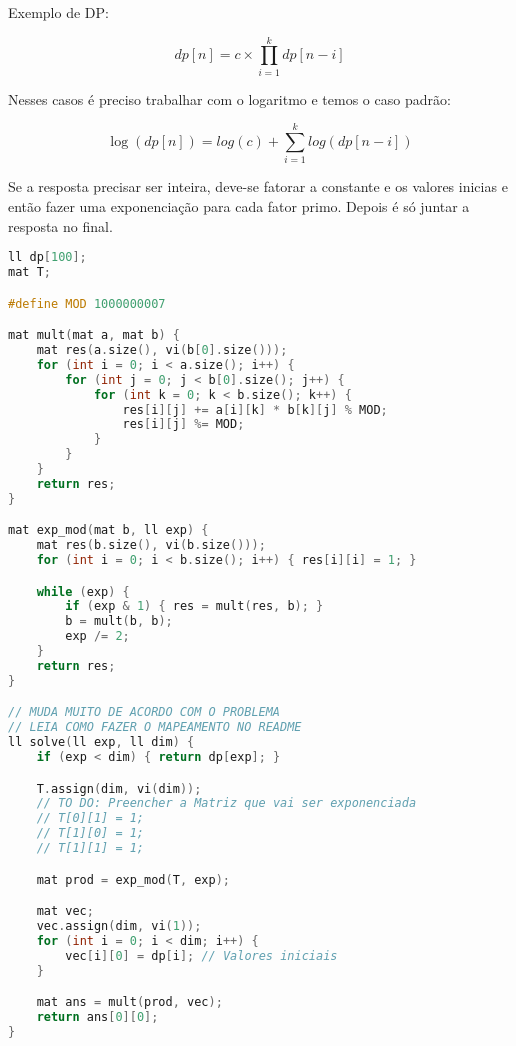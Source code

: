 \documentclass[11pt, a4paper, twoside]{book}
\begin{document}
\textbf{} 


Exemplo de DP:



$$ dp[n] =  c\times \prod_{i=1}^{k} dp[n-i] $$



Nesses casos é preciso trabalhar com o logaritmo e temos o caso padrão:





$$ \log(dp[n]) =  log(c) + \sum_{i=1}^{k} log(dp[n-i]) $$



Se a resposta precisar ser inteira, deve-se fatorar a constante e os valores inicias e então fazer uma exponenciação para cada fator primo. Depois é só juntar a resposta no final.


\hfill

\begin{lstlisting}[language=C++]
ll dp[100];
mat T;

#define MOD 1000000007

mat mult(mat a, mat b) {
    mat res(a.size(), vi(b[0].size()));
    for (int i = 0; i < a.size(); i++) {
        for (int j = 0; j < b[0].size(); j++) {
            for (int k = 0; k < b.size(); k++) {
                res[i][j] += a[i][k] * b[k][j] % MOD;
                res[i][j] %= MOD;
            }
        }
    }
    return res;
}

mat exp_mod(mat b, ll exp) {
    mat res(b.size(), vi(b.size()));
    for (int i = 0; i < b.size(); i++) { res[i][i] = 1; }

    while (exp) {
        if (exp & 1) { res = mult(res, b); }
        b = mult(b, b);
        exp /= 2;
    }
    return res;
}

// MUDA MUITO DE ACORDO COM O PROBLEMA
// LEIA COMO FAZER O MAPEAMENTO NO README
ll solve(ll exp, ll dim) {
    if (exp < dim) { return dp[exp]; }

    T.assign(dim, vi(dim));
    // TO DO: Preencher a Matriz que vai ser exponenciada
    // T[0][1] = 1;
    // T[1][0] = 1;
    // T[1][1] = 1;

    mat prod = exp_mod(T, exp);

    mat vec;
    vec.assign(dim, vi(1));
    for (int i = 0; i < dim; i++) {
        vec[i][0] = dp[i]; // Valores iniciais
    }

    mat ans = mult(prod, vec);
    return ans[0][0];
}\end{lstlisting}

\hfill
\end{document}
